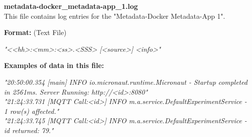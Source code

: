 \begin{description}
\begin{addmargin}[0em]{0em}
    \label{metadata-docker_metadata-app_1.log}
    \begin{addmargin}[1em]{0em} %
        \textbf{metadata-docker\_metadata-app\_1.log}\\
        This file contains log entries for the "Metadata-Docker Metadata-App 1".
        \begin{addmargin}[1em]{0em}
            \textbf{Format:} (Text File)
            \begin{addmargin}[1em]{0em}
                \textit{"<<hh>:<mm>:<ss>.<SSS> [<source>] <info>"}
            \end{addmargin}
        \end{addmargin}
        \begin{addmargin}[1em]{0em}
            \textbf{Examples of data in this file:}
            \begin{addmargin}[1em]{0em}\textit{"20:50:00.354 [main] INFO  io.micronaut.runtime.Micronaut - Startup completed in 2561ms. Server Running: http://<id>:8080"\\
                "21:24:33.731 [MQTT Call:<id>] INFO  m.a.service.DefaultExperimentService - 1 row(s) affected."\\
                "21:24:33.745 [MQTT Call:<id>] INFO  m.a.service.DefaultExperimentService - id returned: 79."}
            \end{addmargin}
        \end{addmargin}
    \end{addmargin} %
    \textbf{\\}


\end{addmargin}
\end{description}
